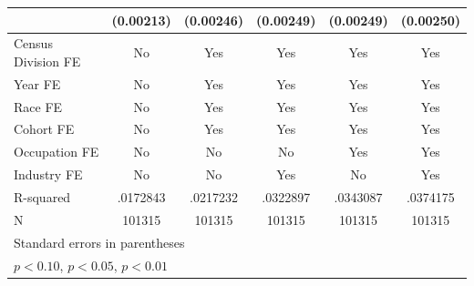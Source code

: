 {\begin{tabular}{l*{5}{c}}
                    &   (0.00213)         &   (0.00246)         &   (0.00249)         &   (0.00249)         &   (0.00250)         \\
\hline
Census Division FE  &          No         &         Yes         &         Yes         &         Yes         &         Yes         \\
Year FE             &          No         &         Yes         &         Yes         &         Yes         &         Yes         \\
Race FE             &          No         &         Yes         &         Yes         &         Yes         &         Yes         \\
Cohort FE           &          No         &         Yes         &         Yes         &         Yes         &         Yes         \\
Occupation FE       &          No         &          No         &          No         &         Yes         &         Yes         \\
Industry FE         &          No         &          No         &         Yes         &          No         &         Yes         \\
R-squared           &    .0172843         &    .0217232         &    .0322897         &    .0343087         &    .0374175         \\
N                   &      101315         &      101315         &      101315         &      101315         &      101315         \\
\hline\hline
\multicolumn{6}{l}{\footnotesize Standard errors in parentheses}\\
\multicolumn{6}{l}{\footnotesize \sym{*} \(p<0.10\), \sym{**} \(p<0.05\), \sym{***} \(p<0.01\)}\\
\end{tabular}
}
